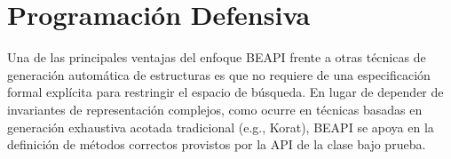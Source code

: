 







\section{Programación Defensiva}
\label{sec:defensiveProgramming}

Una de las principales ventajas del enfoque \textsf{BEAPI} frente a otras técnicas de generación automática de estructuras 
es que no requiere de una especificación formal explícita para restringir el espacio de búsqueda. 
En lugar de depender de invariantes de representación complejos, como ocurre en técnicas basadas en generación exhaustiva acotada tradicional 
(e.g., \textsf{Korat}), \textsf{BEAPI} se apoya en la definición de métodos correctos provistos por la API de la clase bajo prueba.

